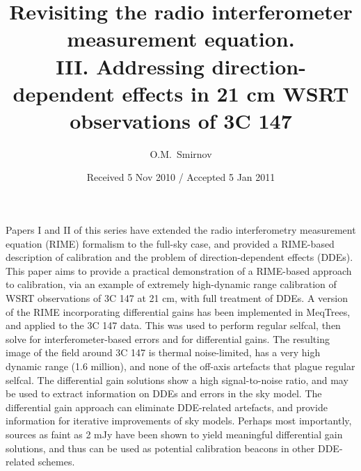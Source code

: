 \documentclass{aa}
\begin{document}
\title{Revisiting the radio interferometer measurement equation.\\III. Addressing direction-dependent effects in 21 cm WSRT observations of 3C 147}

\author{O.M.\ Smirnov}


\date{Received 5 Nov 2010 / Accepted 5 Jan 2011}


\abstract%
{Papers I and II of this series have extended the radio interferometry measurement equation (RIME) formalism to the full-sky case,
and provided a RIME-based description of calibration and the problem of direction-dependent effects (DDEs).}
{This paper aims to provide a practical demonstration of a RIME-based approach to calibration, via
an example of extremely high-dynamic range calibration of WSRT observations of 3C 147 at 21 cm, with full treatment of DDEs.}
{A version of the RIME incorporating differential gains has been implemented in MeqTrees, and applied to the 3C 147 data. This was
used to perform regular selfcal, then solve for interferometer-based errors and for differential gains.}%
{The resulting image of the field around 3C 147 is thermal noise-limited, has a very high dynamic range (1.6 million), 
and none of the off-axis artefacts that plague regular selfcal. The differential gain solutions show a high signal-to-noise 
ratio, and may be used to extract information on DDEs and errors in the sky model.
}%
{The differential gain approach can eliminate DDE-related artefacts, and provide information for iterative improvements of sky models. 
Perhaps most importantly, sources as faint as 2 mJy have been shown to yield meaningful differential gain solutions, 
and thus can be used as potential calibration beacons in other DDE-related schemes.}


\maketitle
\end{document}
